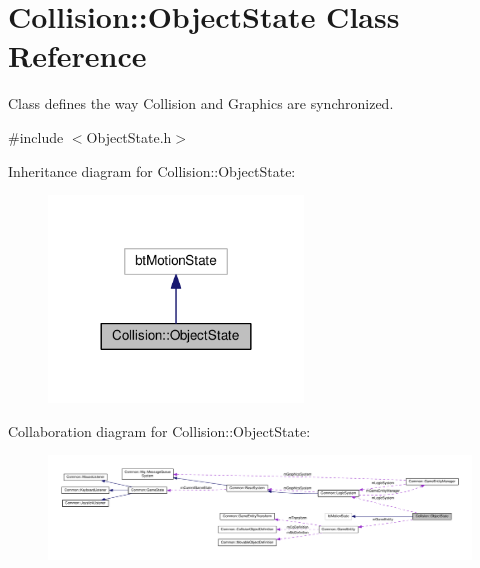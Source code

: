 \hypertarget{class_collision_1_1_object_state}{}\section{Collision\+:\+:Object\+State Class Reference}
\label{class_collision_1_1_object_state}


Class defines the way Collision and Graphics are synchronized.  




{\ttfamily \#include $<$Object\+State.\+h$>$}



Inheritance diagram for Collision\+:\+:Object\+State\+:\nopagebreak
\begin{figure}[H]
\begin{center}
\leavevmode
\includegraphics[width=192pt]{class_collision_1_1_object_state__inherit__graph}
\end{center}
\end{figure}


Collaboration diagram for Collision\+:\+:Object\+State\+:\nopagebreak
\begin{figure}[H]
\begin{center}
\leavevmode
\includegraphics[width=350pt]{class_collision_1_1_object_state__coll__graph}
\end{center}
\end{figure}
